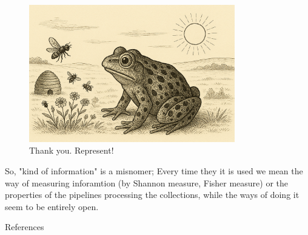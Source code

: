 \documentclass[10pt, aspectratio=169]{beamer}
\begin{document}
    
    \begin{frame}
        \begin{figure}[h!]
            \centering
            \includegraphics[width=0.8\textwidth]{images/frog_world.png}
            \caption{\Huge Thank you. Represent! }
            
        \end{figure}
      
    \end{frame}
    
    
\begin{frame}

    So, "kind of information" is a misnomer;
    Every time they it is used we mean  the way of measuring inforamtion (by Shannon measure, Fisher measure)  or the properties of the pipelines processing the collections, while the ways of doing it seem to be entirely open.

    

\end{frame}



    \begin{frame}[allowframebreaks]{References}
   \small
        \printbibliography
    \end{frame}



        
\end{document}
